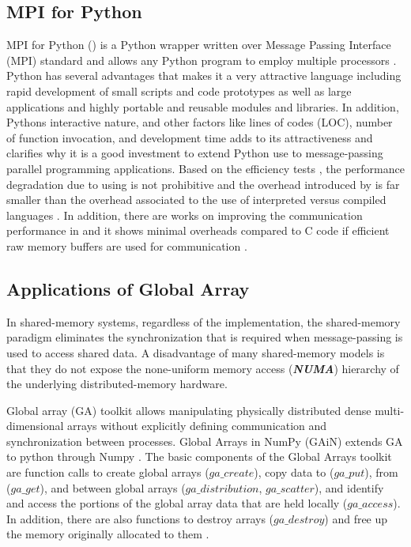 \label{methods}
\subsection{MPI for Python }
MPI for Python () is a Python wrapper written over Message Passing Interface (MPI) standard and allows any Python program to employ multiple processors \cite{Dalcin:2011aa, Dalcin:2005aa}.
Python has several advantages that makes it a very attractive language including rapid development of small scripts and code prototypes as well as large applications and highly portable and reusable modules and libraries.
In addition, Python\textsc{}s interactive nature, and other factors like lines of codes (LOC), number of function invocation, and development time adds to its attractiveness and clarifies why it is a good investment to extend Python use to message-passing parallel programming applications.
Based on the efficiency tests \cite{Dalcin:2011aa, Dalcin:2005aa}, the performance degradation due to using  is not prohibitive and the overhead introduced by  is far smaller than the overhead associated to the use of interpreted versus compiled languages \cite{GAiN}.
In addition, there are works on improving the communication performance in  and it shows minimal overheads compared to C code if efficient raw memory buffers are used for communication \cite{Dalcin:2011aa}.

\subsection{Applications of Global Array}
In shared-memory systems, regardless of the implementation, the shared-memory paradigm eliminates the synchronization that is required when message-passing is used to access shared data. 
A disadvantage of many shared-memory models is that they do not expose the none-uniform memory access (\textbf{\textit{NUMA}}) hierarchy of the underlying distributed-memory hardware. 

Global array (GA) toolkit allows manipulating physically distributed dense multi-dimensional arrays without explicitly defining communication and synchronization between processes.
Global Arrays in NumPy (GAiN) extends GA to python through Numpy \cite{GAiN}. 
The basic components of the Global Arrays toolkit are function calls to create global arrays ($ga\_create$), copy data to ($ga\_put$), from ($ga\_get$), and between global arrays ($ga\_distribution$, $ga\_scatter$), and identify and access the portions of the global array data that are held locally ($ga\_access$). 
In addition, there are also functions to destroy arrays ($ga\_destroy$) and free up the memory originally allocated to them \cite{GAiN}.

